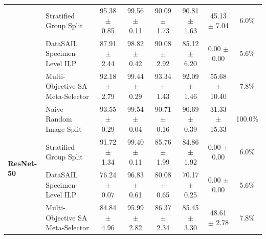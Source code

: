 \begin{table}[htbp]
{\begin{tabular}{llcccccc}
 & Stratified Group Split & 95.38 $\pm$ 0.85 & 99.56 $\pm$ 0.11 & 90.09 $\pm$ 1.73 & 90.81 $\pm$ 1.63 & 45.13 $\pm$ 7.04 & 6.0\% \\
 & DataSAIL Specimen-Level ILP & 87.91 $\pm$ 2.44 & 98.82 $\pm$ 0.42 & 90.08 $\pm$ 2.92 & 85.12 $\pm$ 6.20 & 0.00 $\pm$ 0.00 & 5.6\% \\
 & Multi-Objective SA Meta-Selector & 92.18 $\pm$ 2.79 & 99.44 $\pm$ 0.29 & 93.34 $\pm$ 1.43 & 92.09 $\pm$ 1.46 & 55.68 $\pm$ 10.40 & 7.8\% \\
\midrule
\multirow{4}{*}{\textbf{ResNet-50}} & Naive Random Image Split & 93.55 $\pm$ 0.29 & 99.54 $\pm$ 0.04 & 90.71 $\pm$ 0.16 & 90.69 $\pm$ 0.39 & 31.33 $\pm$ 15.33 & 100.0\% \\
 & Stratified Group Split & 91.72 $\pm$ 1.34 & 99.40 $\pm$ 0.11 & 85.76 $\pm$ 1.99 & 84.86 $\pm$ 1.92 & 0.00 $\pm$ 0.00 & 6.0\% \\
 & DataSAIL Specimen-Level ILP & 76.24 $\pm$ 0.07 & 96.83 $\pm$ 0.61 & 80.08 $\pm$ 0.65 & 70.17 $\pm$ 0.25 & 0.00 $\pm$ 0.00 & 5.6\% \\
 & Multi-Objective SA Meta-Selector & 84.84 $\pm$ 4.96 & 95.99 $\pm$ 2.82 & 86.37 $\pm$ 2.34 & 85.45 $\pm$ 3.30 & 48.61 $\pm$ 2.78 & 7.8\% \\
\bottomrule
\end{tabular}%
}
\end{table}
